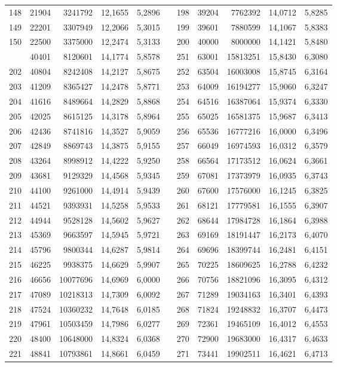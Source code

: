 \begin{longtable}{rrrrrrrrrrr}
148&21904&3241792&12,1655&5,2896&&198&39204&7762392&14,0712&5,8285\\
149&22201&3307949&12,2066&5,3015&&199&39601&7880599&14,1067&5,8383\\
150&22500&3375000&12,2474&5,3133&&200&40000&8000000&14,1421&5,8480\\
\newpage
201&40401&8120601&14,1774&5,8578&&251&63001&15813251&15,8430&6,3080\\
202&40804&8242408&14,2127&5,8675&&252&63504&16003008&15,8745&6,3164\\
203&41209&8365427&14,2478&5,8771&&253&64009&16194277&15,9060&6,3247\\
204&41616&8489664&14,2829&5,8868&&254&64516&16387064&15,9374&6,3330\\
205&42025&8615125&14,3178&5,8964&&255&65025&16581375&15,9687&6,3413\\
206&42436&8741816&14,3527&5,9059&&256&65536&16777216&16,0000&6,3496\\
207&42849&8869743&14,3875&5,9155&&257&66049&16974593&16,0312&6,3579\\
208&43264&8998912&14,4222&5,9250&&258&66564&17173512&16,0624&6,3661\\
209&43681&9129329&14,4568&5,9345&&259&67081&17373979&16,0935&6,3743\\
210&44100&9261000&14,4914&5,9439&&260&67600&17576000&16,1245&6,3825\\
211&44521&9393931&14,5258&5,9533&&261&68121&17779581&16,1555&6,3907\\
212&44944&9528128&14,5602&5,9627&&262&68644&17984728&16,1864&6,3988\\
213&45369&9663597&14,5945&5,9721&&263&69169&18191447&16,2173&6,4070\\
214&45796&9800344&14,6287&5,9814&&264&69696&18399744&16,2481&6,4151\\
215&46225&9938375&14,6629&5,9907&&265&70225&18609625&16,2788&6,4232\\
216&46656&10077696&14,6969&6,0000&&266&70756&18821096&16,3095&6,4312\\
217&47089&10218313&14,7309&6,0092&&267&71289&19034163&16,3401&6,4393\\
218&47524&10360232&14,7648&6,0185&&268&71824&19248832&16,3707&6,4473\\
219&47961&10503459&14,7986&6,0277&&269&72361&19465109&16,4012&6,4553\\
220&48400&10648000&14,8324&6,0368&&270&72900&19683000&16,4317&6,4633\\
221&48841&10793861&14,8661&6,0459&&271&73441&19902511&16,4621&6,4713\\

\end{longtable}
